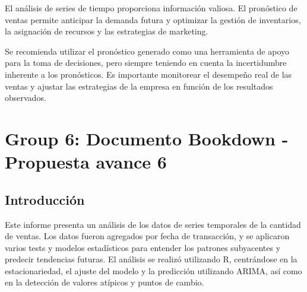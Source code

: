 \documentclass[
]{book}
\begin{document}
El análisis de series de tiempo proporciona información valiosa. El pronóstico de ventas permite anticipar la demanda futura y optimizar la gestión de inventarios, la asignación de recursos y las estrategias de marketing.

Se recomienda utilizar el pronóstico generado como una herramienta de apoyo para la toma de decisiones, pero siempre teniendo en cuenta la incertidumbre inherente a los pronósticos. Es importante monitorear el desempeño real de las ventas y ajustar las estrategias de la empresa en función de los resultados observados.

\chapter{Group 6: Documento Bookdown - Propuesta avance 6}\label{group-6-documento-bookdown---propuesta-avance-6}

\section{Introducción}\label{introducciuxf3n-2}

Este informe presenta un análisis de los datos de series temporales de la cantidad de ventas. Los datos fueron agregados por fecha de transacción, y se aplicaron varios tests y modelos estadísticos para entender los patrones subyacentes y predecir tendencias futuras. El análisis se realizó utilizando R, centrándose en la estacionariedad, el ajuste del modelo y la predicción utilizando ARIMA, así como en la detección de valores atípicos y puntos de cambio.
\end{document}
